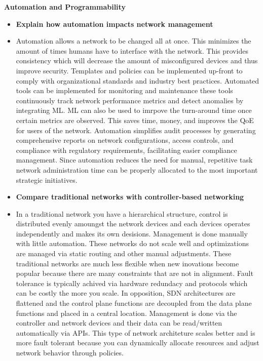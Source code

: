 \documentclass{article}
\begin{document}
\begin{flushleft}\textbf{Automation and Programmability}\end{flushleft}
\begin{itemize}
  \item \textbf{Explain how automation impacts network management}
  	\item[] Automation allows a network to be changed all at once. This minimizes the amount of times humans have to interface with the network. This provides consistency which will decrease the amount of misconfigured devices and thus improve security. Templates and policies can be implemented up-front to comply with organizational standards and industry best practices. Automated tools can be implemented for monitoring and maintenance these tools continuously track network performance metrics and detect anomalies by integrating ML. ML can also be used to imrpove the turn-around time once certain metrics are observed. This saves time, money, and improves the QoE for users of the network. Automation simplifies audit processes by generating comprehensive reports on network configurations, access controls, and compliance with regulatory requirements, facilitating easier compliance management. Since automation reduces the need for manual, repetitive task network administration time can be properly allocated to the most important strategic initiatives.
  	  
  \item \textbf{Compare traditional networks with controller-based networking}
  	\item[] In a traditional network you have a hierarchical structure, control is distributed evenly amoungst the network devices and each devices operates independently and makes its own desisions. Management is done manually with little automation. These networks do not scale well and optimizations are managed via static routing and other manual adjustments. These traditional networks are much less flexible when new inovations become popular because there are many constraints that are not in alignment. Fault tolerance is typically achived via hardware redundacy and protocols which can be costly the more you scale. In opposition, SDN architectures are flattened and the control plane functions are decoupled from the data plane functions and placed in a central location. Management is done via the controller and network devices and their data can be read/written automatically via APIs. This type of network architeture scales better and is more fault tolerant because you can dynamically allocate resources and adjust network behavior through policies.  
  

\end{itemize}
\end{document}
